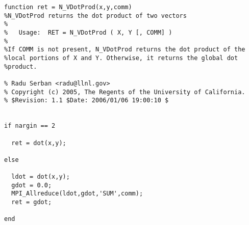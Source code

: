 \begin{lstlisting}[linerange={1-1,9-27}]
function ret = N_VDotProd(x,y,comm)
%N_VDotProd returns the dot product of two vectors
%
%   Usage:  RET = N_VDotProd ( X, Y [, COMM] )
%
%If COMM is not present, N_VDotProd returns the dot product of the
%local portions of X and Y. Otherwise, it returns the global dot
%product.

% Radu Serban <radu@llnl.gov>
% Copyright (c) 2005, The Regents of the University of California.
% $Revision: 1.1 $Date: 2006/01/06 19:00:10 $


if nargin == 2
  
  ret = dot(x,y);
  
else
  
  ldot = dot(x,y);
  gdot = 0.0;
  MPI_Allreduce(ldot,gdot,'SUM',comm);
  ret = gdot;
  
end\end{lstlisting}
